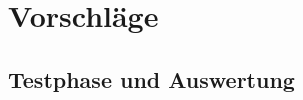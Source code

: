 \section{Vorschläge} 
\label{sec:Vorschläge}
\vfill


\subsection{Testphase und Auswertung}
\label{subsec:TestenVonCRS}
\vfill
